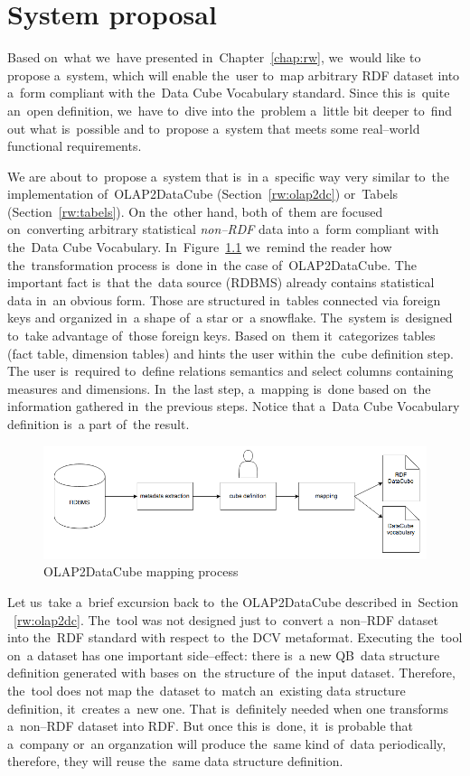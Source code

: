 \chapter{System proposal}
\label{ch:proposal}
Based on~what we~have presented in~Chapter~\ref{chap:rw}, we~would like to
propose a~system, which will enable the~user to~map arbitrary RDF dataset
into a~form compliant with the~Data Cube Vocabulary standard. Since this is~quite an~open definition, we~have to~dive into the~problem a~little bit deeper to~find out what is~possible and to~propose a~system that meets some real--world 
functional requirements.

We are about to~propose a~system that is~in a~specific way very similar to~the implementation of~OLAP2DataCube (Section~\ref{rw:olap2dc}) or~Tabels (Section~\ref{rw:tabels}).
On the~other hand, both of~them are 
focused on~converting arbitrary statistical \emph{non--RDF} data into a~form 
compliant with the~Data Cube Vocabulary. In~Figure~\ref{fig:olap2dc-mapping} we~remind
the reader how the~transformation process is~done in~the case of~OLAP2DataCube.
The important fact is~that the~data source (RDBMS) already contains statistical data in~an obvious form. 
Those are structured in~tables connected via foreign keys and organized in~a 
shape of~a star or~a snowflake. The~system is~designed to~take advantage of~those 
foreign keys. Based on~them it~categorizes tables (fact table, dimension tables) and hints
the user within the~cube definition step.
The user is~required to~define relations semantics and select columns 
containing measures and dimensions. In~the last step, a~mapping is~done based on~the information gathered in~the previous steps.
Notice that a~Data Cube Vocabulary definition is~a part of~the result.


\begin{figure}
	\centering
	\includegraphics[width=140mm]{img/mapping-olap2dc.png}
	\caption{OLAP2DataCube mapping process}
	\label{fig:olap2dc-mapping}
\end{figure}


Let us~take a~brief excursion back to~the OLAP2DataCube described in~Section 
~\ref{rw:olap2dc}. The~tool was not designed just to~convert a~non--RDF dataset 
into the~RDF standard with respect to~the DCV metaformat. Executing the~tool on~a 
dataset has one important side--effect: there is~a new QB~data structure definition
generated with bases on~the structure of~the input dataset. Therefore, the~tool does not map the~dataset to~match an~existing data structure definition, it~creates a~new one. That is~definitely
needed when one transforms a~non--RDF dataset into RDF. But once 
this is~done, it~is probable that a~company or~an organzation will produce the~same kind of~data periodically, therefore, they will reuse the~same data structure definition.

